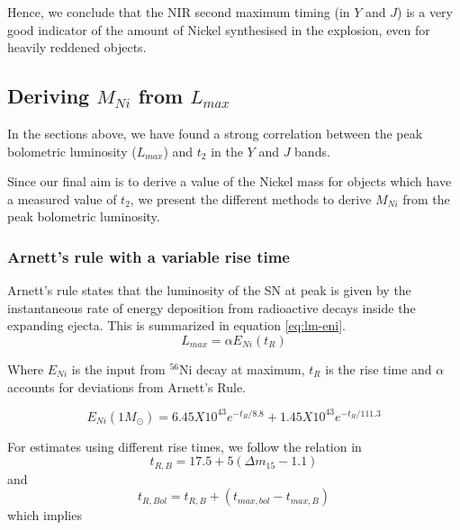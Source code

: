 Hence, we conclude that the NIR second maximum timing (in $Y$ and $J$) is a very good indicator of the amount of Nickel synthesised in the explosion, even for heavily reddened objects. 



\subsection{Deriving $M_{Ni}$ from $L_{max}$}
In the sections above, we have found a strong correlation between the peak bolometric luminosity ($L_{max}$) and $t_2$ in the $Y$ and $J$ bands. 

Since our final aim is to derive a value of the Nickel mass for objects which have a measured value of $t_2$, we present the different methods to derive $M_{Ni}$ from the peak bolometric luminosity.

\subsubsection{Arnett's rule with a variable rise time}
Arnett's rule states that the luminosity of the SN at peak is given by the instantaneous rate of energy deposition from radioactive decays inside the expanding ejecta. 
This is summarized in equation \eqref{eq:lm-eni}. 
\begin{equation}
L_{max}=\alpha E_{Ni} (t_R)
\end{equation}

Where $E_{Ni}$ is the input from $^{56}$Ni decay at maximum, $t_R$ is the rise time and $\alpha$ accounts for deviations from Arnett's Rule.

\begin{equation}
\label{eq:eni}
E_{Ni} (1 M_{\odot})= 6.45  X  10^{43} e^{-t_R/8.8} + 1.45  X  10^{43} e^{-t_R/111.3}
\end{equation}

For estimates using different rise times, we follow the relation in \citet{G2011}
\begin{equation}
t_{R, B}=17.5 + 5(\Delta m_{15} - 1.1)
\end{equation}
and  
\begin{equation}
t_{R, Bol}=t_{R, B}+ (t_{max, bol} -t_{max, B})
\end{equation}
which implies 

